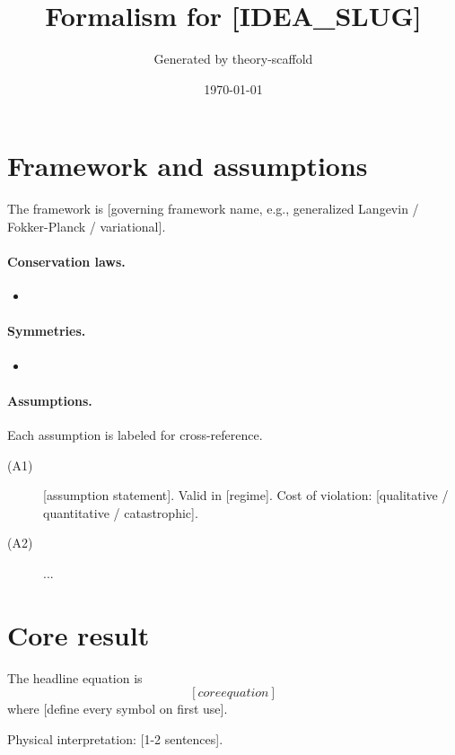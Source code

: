 \documentclass[11pt]{article}
\title{Formalism for [IDEA\_SLUG]}
\author{Generated by theory-scaffold}
\date{\today}
\begin{document}
\maketitle

\section{Framework and assumptions}
\label{sec:framework}

The framework is [governing framework name, e.g., generalized Langevin / Fokker-Planck / variational].

\paragraph{Conservation laws.}
\begin{itemize}
    \item [list, e.g., total particle number conserved]
\end{itemize}

\paragraph{Symmetries.}
\begin{itemize}
    \item [list]
\end{itemize}

\paragraph{Assumptions.} Each assumption is labeled for cross-reference.
\begin{description}
    \item[(A1)] [assumption statement]. Valid in [regime]. Cost of violation: [qualitative / quantitative / catastrophic].
    \item[(A2)] ...
\end{description}

\section{Core result}
\label{sec:core}

The headline equation is
\begin{equation}
    \label{eq:core}
    [core equation]
\end{equation}
where [define every symbol on first use].

Physical interpretation: [1-2 sentences].
\end{document}
